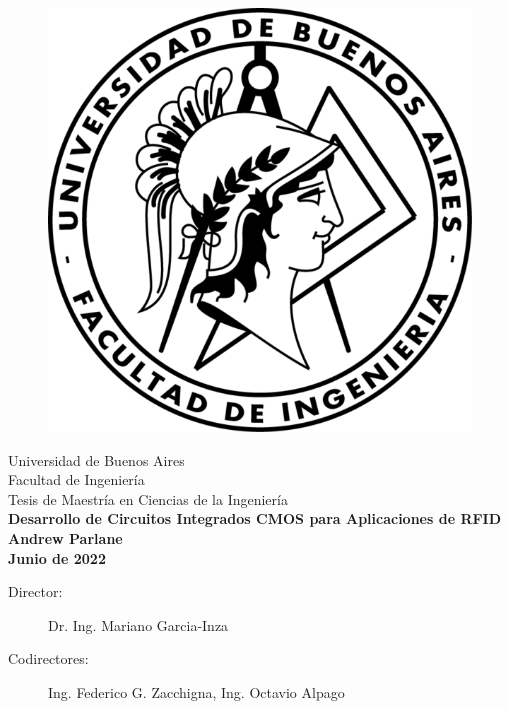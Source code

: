 \documentclass[a4paper, twoside, 11pt]{report}
\begin{document}
\begin{titlepage}

\capstartfalse
\begin{figure}
\centering
\includegraphics[scale=1.7]{./img/logo-facu.png}
\end{figure}
\capstarttrue

\begin{center}
    \Large{Universidad de Buenos Aires} \\
    \Large{Facultad de Ingeniería} \\
    \Large{Tesis de Maestría en Ciencias de la Ingeniería} \\
    \vspace{5mm}
    \huge{\bf Desarrollo de Circuitos Integrados CMOS para Aplicaciones de RFID} \\
    \vspace{8mm}
    \huge{\bf Andrew Parlane} \\
    \vspace{8mm}
    \huge{\bf Junio de 2022}
\end{center}

\vspace*{\fill}

\begin{description}
    \item[\large{Director:}] \hspace{21pt} \large{Dr. Ing. Mariano Garcia-Inza}
    \item[\large{Codirectores:}] \large{Ing. Federico G. Zacchigna, Ing. Octavio Alpago}
\end{description}
\end{titlepage}
\end{document}
